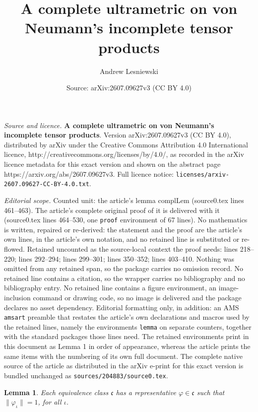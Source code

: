 \documentclass[10pt,a4paper]{amsart}
\title{\textbf{A complete ultrametric on von Neumann's incomplete tensor products}}
\author{Andrew Lesniewski}
\date{Source: arXiv:2607.09627v3 (CC BY 4.0)}
\newtheorem{lemma}{Lemma}
\def\fc{{\mathfrak{c}}}
\begin{document}
\maketitle

\noindent\emph{Source and licence.} \textbf{A complete ultrametric on von Neumann's incomplete tensor products}. Version arXiv:2607.09627v3 (CC BY 4.0), distributed by arXiv under the Creative Commons Attribution 4.0 International licence, http://creativecommons.org/licenses/by/4.0/, as recorded in the arXiv licence metadata for this exact version and shown on the abstract page https://arxiv.org/abs/2607.09627v3. Full licence notice: \texttt{licenses/arxiv-2607.09627-CC-BY-4.0.txt}.\par\smallskip

\noindent\textit{Editorial scope.} Counted unit: the article's lemma complLem (source0.tex lines 461--463). The article's complete original proof of it is delivered with it (source0.tex lines 464--530, one \texttt{proof} environment of 67 lines). No mathematics is written, repaired or re-derived: the statement and the proof are the article's own lines, in the article's own notation, and no retained line is substituted or re-flowed.  Retained uncounted as the source-local context the proof needs: lines 218--220; lines 292--294; lines 299--301; lines 350--352; lines 403--410.  Nothing was omitted from any retained span, so the package carries no omission record.  No retained line contains a citation, so the wrapper carries no bibliography and no bibliography entry.  No retained line contains a figure environment, an image-inclusion command or drawing code, so no image is delivered and the package declares no asset dependency.  Editorial formatting only, in addition: an AMS \texttt{amsart} preamble that restates the article's own declarations and macros used by the retained lines, namely the environments \texttt{lemma} on separate counters, together with the standard packages those lines need.  The retained environments print in this document as Lemma 1 in order of appearance, whereas the article prints the same items with the numbering of its own full document.  The complete native source of the article as distributed in the arXiv e-print for this exact version is bundled unchanged as \texttt{sources/204883/source0.tex}.
\begin{lemma}\label{unitRep}
Each equivalence class $\fc$ has a representative $\varphi\in\fc$ such that $\|\varphi_\iota\|=1$, for all $\iota$.
\end{lemma}
\end{document}
